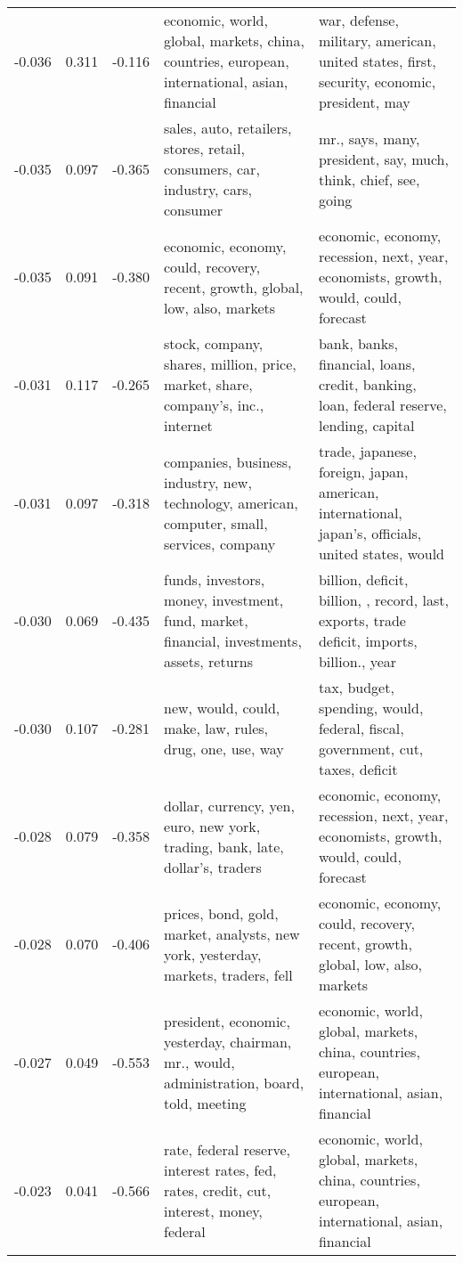 \begin{tabular}{cccp{5cm}p{5cm}}
-0.036 & 0.311 & -0.116 & economic, world, global, markets, china, countries, european, international, asian, financial & war, defense, military, american, united states, first, security, economic, president, may \\
-0.035 & 0.097 & -0.365 & sales, auto, retailers, stores, retail, consumers, car, industry, cars, consumer & mr., says, many, president, say, much, think, chief, see, going \\
-0.035 & 0.091 & -0.380 & economic, economy, could, recovery, recent, growth, global, low, also, markets & economic, economy, recession, next, year, economists, growth, would, could, forecast \\
-0.031 & 0.117 & -0.265 & stock, company, shares, million, price, market, share, company's, inc., internet & bank, banks, financial, loans, credit, banking, loan, federal reserve, lending, capital \\
-0.031 & 0.097 & -0.318 & companies, business, industry, new, technology, american, computer, small, services, company & trade, japanese, foreign, japan, american, international, japan's, officials, united states, would \\
-0.030 & 0.069 & -0.435 & funds, investors, money, investment, fund, market, financial, investments, assets, returns & billion, deficit, billion, , record, last, exports, trade deficit, imports, billion., year \\
-0.030 & 0.107 & -0.281 & new, would, could, make, law, rules, drug, one, use, way & tax, budget, spending, would, federal, fiscal, government, cut, taxes, deficit \\
-0.028 & 0.079 & -0.358 & dollar, currency, yen, euro, new york, trading, bank, late, dollar's, traders & economic, economy, recession, next, year, economists, growth, would, could, forecast \\
-0.028 & 0.070 & -0.406 & prices, bond, gold, market, analysts, new york, yesterday, markets, traders, fell & economic, economy, could, recovery, recent, growth, global, low, also, markets \\
-0.027 & 0.049 & -0.553 & president, economic, yesterday, chairman, mr., would, administration, board, told, meeting & economic, world, global, markets, china, countries, european, international, asian, financial \\
-0.023 & 0.041 & -0.566 & rate, federal reserve, interest rates, fed, rates, credit, cut, interest, money, federal & economic, world, global, markets, china, countries, european, international, asian, financial \\

\end{tabular}
